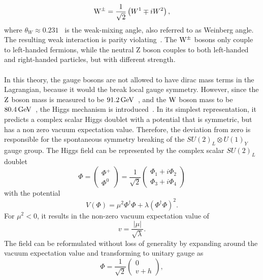 \begin{equation}
 \mathrm{W}^\pm = \frac{1}{\sqrt{2}}\left(W^1\mp i W^2\right),
\end{equation}
where $\theta_W\approx0.231$~\cite{PDG} is the weak-mixing angle, also referred to as Weinberg angle.
The resulting weak interaction is parity violating~\cite{Wu,Goldhaber}. The $\mathrm{W}^\pm$ bosons only couple to left-handed fermions, while the neutral Z boson couples to both left-handed and right-handed particles, but with different strength.\\
\\In this theory, the gauge bosons are not allowed to have dirac mass terms in the Lagrangian, because it would the break local gauge symmetry. However, since the $\mathrm{Z}$ boson mass is measured to be $91.2\,\text{Ge\hspace{-.08em}V}$~\cite{PDG}, and the $\mathrm{W}$ boson mass to be $80.4\,\text{Ge\hspace{-.08em}V}$~\cite{PDG}, the Higgs mechanism is introduced~\cite{Higgs1,Higgs2,Higgs3}. In its simplest representation, it predicts a complex scalar Higgs doublet with a potential that is symmetric, but has a non zero vacuum expectation value. Therefore, the deviation from zero is responsible for the spontaneous symmetry breaking of the $ SU(2)_L\otimes U(1)_Y$ gauge group. The Higgs field can be represented by the complex scalar $SU(2)_L$ doublet
\begin{equation}
 \Phi=
 \left(\begin{matrix}
   \Phi^{+} \\
   \Phi^0
  \end{matrix}
 \right)
 =
 \frac{1}{\sqrt{2}}
 \left(\begin{matrix}
   \Phi_1 + i \Phi_2 \\
   \Phi_3 + i\Phi_4
  \end{matrix}
 \right)
\end{equation}
with the potential
\begin{equation}
 V(\Phi)=\mu^2 \Phi^{\dagger}\Phi+\lambda\left(\Phi^{\dagger}\Phi\right)^2.
\end{equation}
For $\mu^2<0$, it results in the non-zero vacuum expectation value of
\begin{equation}
 v = \frac{|\mu|}{\sqrt{\lambda}}.
\end{equation}
The field can be reformulated without loss of generality by expanding around the vacuum expectation value and transforming to unitary gauge as
\begin{equation}
 \Phi = \frac{1}{\sqrt{2}}
 \left(\begin{matrix}
   0 \\
   v+h
  \end{matrix}
 \right),
\end{equation}
